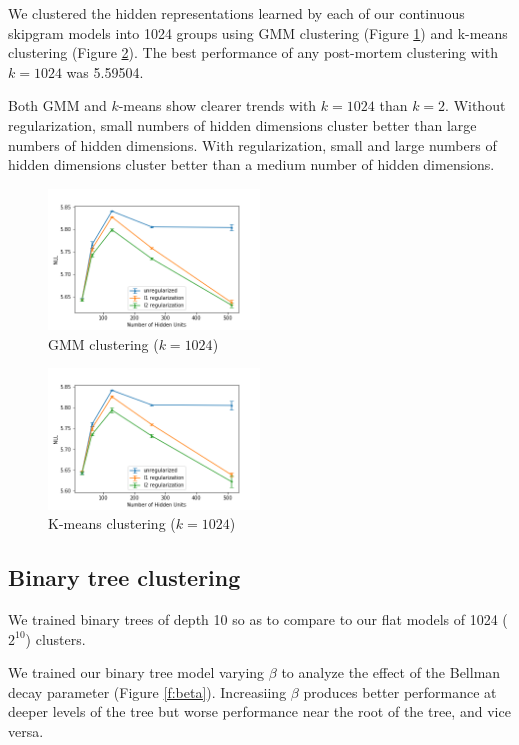 \documentclass[11pt,letterpaper]{article}
\begin{document}
We clustered the hidden representations learned by each of our continuous skipgram models into 1024 groups using GMM clustering (Figure \ref{f:fgmm}) and k-means clustering (Figure \ref{f:fkm}). The best performance of any post-mortem clustering with $k=1024$ was 5.59504.

Both GMM and $k$-means show clearer trends with $k=1024$ than $k=2$. Without regularization, small numbers of hidden dimensions cluster better than large numbers of hidden dimensions. With regularization, small and large numbers of hidden dimensions cluster better than a medium number of hidden dimensions.

\begin{figure}
  \caption{GMM clustering ($k=1024$)}
\label{f:fgmm}
  \centering
    \includegraphics[width=0.5\textwidth]{flat_gmm.png}
\end{figure}


\begin{figure}
  \caption{K-means clustering ($k=1024$)}
\label{f:fkm}
  \centering
    \includegraphics[width=0.5\textwidth]{flat_km.png}
\end{figure}

\subsection{Binary tree clustering}

We trained binary trees of depth 10 so as to compare to our flat models of 1024 ($2^{10}$) clusters.

We trained our binary tree model varying $\beta$ to analyze the effect of the Bellman decay parameter (Figure \ref{f:beta}). Increasiing $\beta$ produces better performance at deeper levels of the tree but worse performance near the root of the tree, and vice versa.
\end{document}
